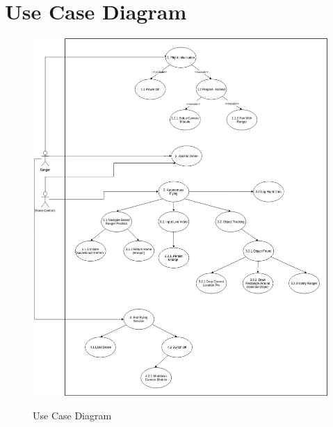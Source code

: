 \section{Use Case Diagram}

	\begin{figure}[h!]
		\centering
		\includegraphics[scale=0.35]{./assets/images/uc-diagram-1.jpg}
		\label{fig: use-case-diagram}
		\caption{Use Case Diagram}
	\end{figure}



